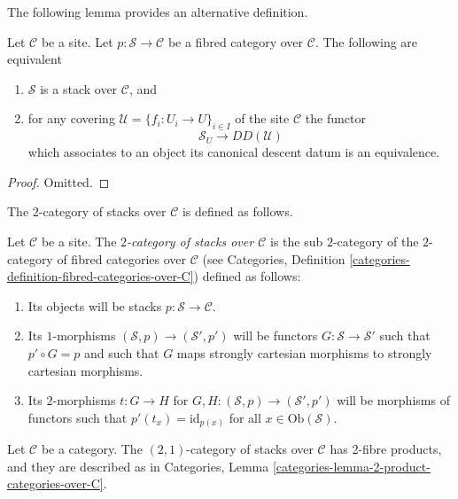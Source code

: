\medskip\noindent
The following lemma provides an alternative definition.

\begin{lemma}
\label{lemma-stack-equivalences}
Let $\mathcal{C}$ be a site.
Let $p : \mathcal{S} \to \mathcal{C}$ be a fibred category
over $\mathcal{C}$. The following are equivalent
\begin{enumerate}
\item $\mathcal{S}$ is a stack over $\mathcal{C}$, and
\item for any covering $\mathcal{U} = \{f_i : U_i \to U\}_{i \in I}$
of the site $\mathcal{C}$ the functor
$$
\mathcal{S}_U \longrightarrow DD(\mathcal{U})
$$
which associates to an
object its canonical descent datum is an equivalence.
\end{enumerate}
\end{lemma}

\begin{proof}
Omitted.
\end{proof}

\noindent
The $2$-category of stacks over $\mathcal{C}$
is defined as follows.

\begin{definition}
\label{definition-stacks-over-C}
Let $\mathcal{C}$ be a site.
The {\it $2$-category of stacks over $\mathcal{C}$}
is the sub $2$-category of the $2$-category of fibred categories
over $\mathcal{C}$ (see
Categories, Definition \ref{categories-definition-fibred-categories-over-C})
defined as follows:
\begin{enumerate}
\item Its objects will be stacks $p : \mathcal{S} \to \mathcal{C}$.
\item Its $1$-morphisms $(\mathcal{S}, p) \to (\mathcal{S}', p')$
will be functors $G : \mathcal{S} \to \mathcal{S}'$ such that
$p' \circ G = p$ and such that $G$ maps strongly cartesian
morphisms to strongly cartesian morphisms.
\item Its $2$-morphisms $t : G \to H$ for
$G, H : (\mathcal{S}, p) \to (\mathcal{S}', p')$
will be morphisms of functors
such that $p'(t_x) = \text{id}_{p(x)}$
for all $x \in \text{Ob}(\mathcal{S})$.
\end{enumerate}
\end{definition}

\begin{lemma}
\label{lemma-2-product-stacks}
Let $\mathcal{C}$ be a category.
The $(2, 1)$-category of stacks over $\mathcal{C}$
has 2-fibre products, and they are described as in
Categories, Lemma \ref{categories-lemma-2-product-categories-over-C}.
\end{lemma}

